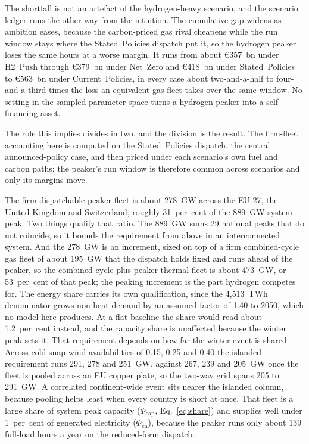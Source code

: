 The shortfall is not an artefact of the hydrogen-heavy scenario, and the scenario ledger
runs the other way from the intuition. The cumulative gap widens as ambition eases,
because the carbon-priced gas rival cheapens while the run window stays where the
Stated~Policies dispatch put it, so the hydrogen peaker loses the same hours at a worse
margin. It runs from about \euro{}357~bn under H2~Push through \euro{}379~bn under
Net~Zero and \euro{}418~bn under Stated~Policies to \euro{}563~bn under
Current~Policies, in every case about two-and-a-half to four-and-a-third times the loss
an equivalent gas fleet takes over the same window. No setting in the sampled parameter
space turns a hydrogen peaker into a self-financing asset.

The role this implies divides in two, and the division is the result. The
firm-fleet accounting here is computed on the Stated~Policies dispatch, the central
announced-policy case, and then priced under each scenario's own fuel and carbon paths;
the peaker's run window is therefore common across scenarios and only its margins move.

The firm dispatchable peaker fleet is about 278~GW across the EU-27, the United Kingdom
and Switzerland, roughly 31~per~cent of the 889~GW system peak. Two things qualify that
ratio. The 889~GW sums 29 national peaks that do not coincide, so it bounds the
requirement from above in an interconnected system. And the 278~GW is an increment, sized
on top of a firm combined-cycle gas fleet of about 195~GW that the dispatch holds fixed
and runs ahead of the peaker, so the combined-cycle-plus-peaker thermal fleet is about 473~GW, or
53~per~cent of that peak; the peaking increment is the part hydrogen competes for. The
energy share carries its own qualification, since the 4{,}513~TWh denominator grows
non-heat demand by an assumed factor of 1.40 to 2050, which no model here produces. At a
flat baseline the share would read about 1.2~per~cent instead, and the capacity share is
unaffected because the winter peak sets it. That requirement depends
on how far the winter event is shared. Across cold-snap wind availabilities of 0.15,
0.25 and 0.40 the islanded requirement runs 291, 278 and 251~GW, against 267, 239 and
205~GW once the fleet is pooled across an EU copper plate, so the two-way grid spans 205
to 291~GW. A correlated continent-wide event sits nearer the islanded column, because
pooling helps least when every country is short at once. That fleet is a large share of
system peak capacity ($\Phi_{\text{cap}}$, Eq.~\eqref{eq:share}) and supplies well under
1~per~cent of generated electricity ($\Phi_{\text{en}}$), because the peaker runs only
about 139 full-load hours a year on the reduced-form dispatch.

